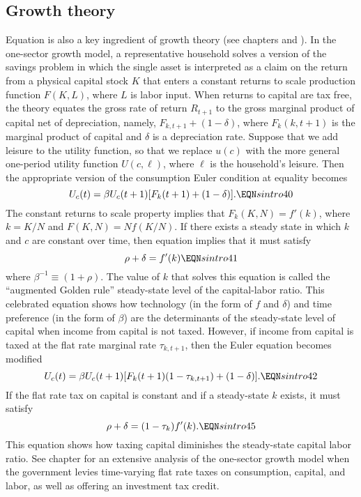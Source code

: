 \subsection{Growth theory}
  Equation  is also a key ingredient of growth theory
(see chapters  and ). In the  one-sector
 growth
model, a representative  household solves a version of  the savings problem
in which
the single asset is interpreted as a claim on the return from a
physical capital stock $K$ that enters a  constant returns to
scale production function $F(K,L)$,  where $L$ is labor input.
When returns to capital are tax free, the theory equates the
gross rate of return $R_{t+1}$ to the gross marginal product of
capital net of depreciation, namely,   $F_{k,t+1} +(1-\delta)$, where
$F_k(k,t+1)$ is the marginal product of capital
 and $\delta$ is a
depreciation  rate. Suppose that we add leisure to the utility
function, so that we replace $u(c)$ with the more
general one-period utility function
$U(c,\ell)$, where $\ell$ is the household's leisure.
Then the appropriate version of the consumption Euler
condition   at equality becomes
$$ U_c(t) = \beta U_c(t+1) [F_k(t+1) + (1-\delta) ]. \EQN sintro40 $$
The constant returns to scale property implies that
$F_k(K,N) = f'(k)$, where $k=K/N$ and $F(K,N)=N f(K/N)$.
If there exists a steady state in which $k$ and $c$ are constant over time,
then equation  implies that
it must satisfy
$$   \rho + \delta = f'(k)  \EQN sintro41 $$
where $\beta^{-1} \equiv (1+\rho)$. The value of $k$ that solves this equation
is called the ``augmented Golden rule'' steady-state level of the capital-labor
ratio. This celebrated equation shows how technology (in the form of
$f$ and $\delta$) and time preference (in the form of $\beta$) are the
determinants of the steady-state level of capital when income from
capital is not taxed.  However,  if income from capital is
taxed at the flat rate marginal
rate $\tau_{k,t+1}$,
then the Euler equation  becomes modified
$$ U_c(t) = \beta U_c(t+1) [F_k(t+1) (1-\tau_{k,t+1})
 + (1-\delta) ].  \EQN sintro42 $$
If the flat rate tax on capital is constant and if a steady-state
$k$ exists, it must satisfy
$$ \rho + \delta = (1-\tau_k) f'(k) . \EQN sintro45 $$
This equation shows how taxing capital diminishes the steady-state
capital labor ratio.   See chapter  for an extensive
analysis of the one-sector growth model when the government levies
time-varying flat rate taxes on  consumption, capital, and labor,
as well as offering an investment tax credit.


